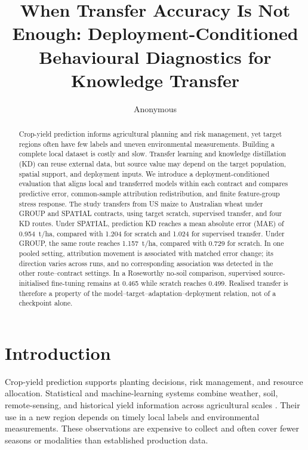 \documentclass[runningheads]{venue/lncs/llncs}
\title{When Transfer Accuracy Is Not Enough: Deployment-Conditioned Behavioural Diagnostics for Knowledge Transfer}
\author{Anonymous}
\institute{Anonymous Institution}
\begin{document}
\maketitle

\begin{abstract}
Crop-yield prediction informs agricultural planning and risk management, yet target regions often have few labels and uneven environmental measurements. Building a complete local dataset is costly and slow. Transfer learning and knowledge distillation (KD) can reuse external data, but source value may depend on the target population, spatial support, and deployment inputs. We introduce a deployment-conditioned evaluation that aligns local and transferred models within each contract and compares predictive error, common-sample attribution redistribution, and finite feature-group stress response. The study transfers from US maize to Australian wheat under GROUP and SPATIAL contracts, using target scratch, supervised transfer, and four KD routes. Under SPATIAL, prediction KD reaches a mean absolute error (MAE) of 0.954~t/ha, compared with 1.204 for scratch and 1.024 for supervised transfer. Under GROUP, the same route reaches 1.157~t/ha, compared with 0.729 for scratch. In one pooled setting, attribution movement is associated with matched error change; its direction varies across runs, and no corresponding association was detected in the other route--contract settings. In a Roseworthy no-soil comparison, supervised source-initialised fine-tuning remains at 0.465 while scratch reaches 0.499. Realised transfer is therefore a property of the model--target--adaptation--deployment relation, not of a checkpoint alone.
\end{abstract}

\section{Introduction}

Crop-yield prediction supports planting decisions, risk management, and resource allocation. Statistical and machine-learning systems combine weather, soil, remote-sensing, and historical yield information across agricultural scales \cite{Kallenberg2026CYBench,Khaki2019DNNYield}. Their use in a new region depends on timely local labels and environmental measurements. These observations are expensive to collect and often cover fewer seasons or modalities than established production data.
\end{document}
